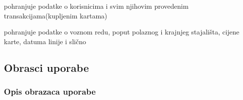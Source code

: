 \begin{packed_enum}
\begin{packed_enum}
				\end{packed_enum}
				
				\item  {}
				
				\begin{packed_enum}
					
					\item pohranjuje podatke o korisnicima i svim njihovim provedenim transakcijama(kupljenim kartama)
					\item pohranjuje podatke o voznom redu, poput polaznog i krajnjeg stajališta, cijene karte, datuma linije i slično
					
				\end{packed_enum}
				
			\end{packed_enum}
			
			\eject 
			
			
				
			\subsection{Obrasci uporabe}
				
				\subsubsection{Opis obrazaca uporabe}

